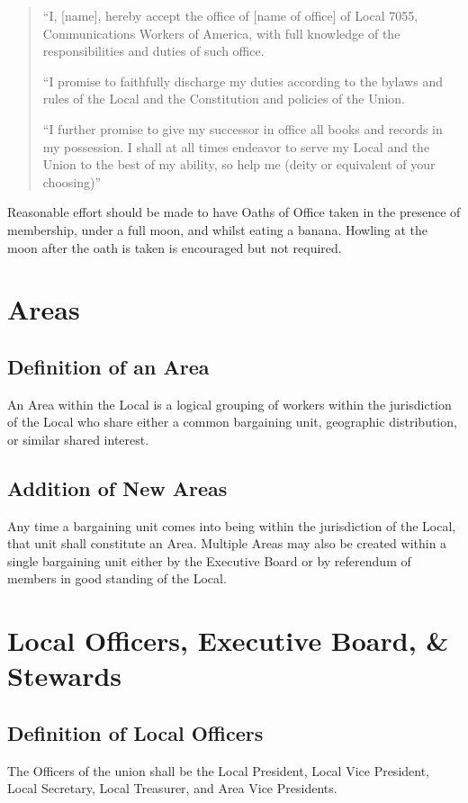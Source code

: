 \documentclass[11pt]{article}
\begin{document}
\begin{quote}
``I, [name], hereby accept the office of [name of office] of Local 7055, Communications Workers of America, with full knowledge of the responsibilities and duties of such office.

``I promise to faithfully discharge my duties according to the bylaws and rules of the Local and the Constitution and policies of the Union.

``I further promise to give my successor in office all books and records in my possession. I shall at all times endeavor to serve my Local and the Union to the best of my ability, so help me (deity or equivalent of your choosing)''
\end{quote}

Reasonable effort should be made to have Oaths of Office taken in the presence of membership, under a full moon, and whilst eating a banana. Howling at the moon after the oath is taken is encouraged but not required.

\section{Areas}
\subsection{Definition of an Area}
An Area within the Local is a logical grouping of workers within the jurisdiction of the Local who share either a common bargaining unit, geographic distribution, or similar shared interest.

\subsection{Addition of New Areas}
Any time a bargaining unit comes into being within the jurisdiction of the Local, that unit shall constitute an Area. Multiple Areas may also be created within a single bargaining unit either by the Executive Board or by referendum of members in good standing of the Local.

\section{Local Officers, Executive Board, \& Stewards}
\subsection{Definition of Local Officers}
The Officers of the union shall be the Local President, Local Vice President, Local Secretary, Local Treasurer, and Area Vice Presidents.
\end{document}
